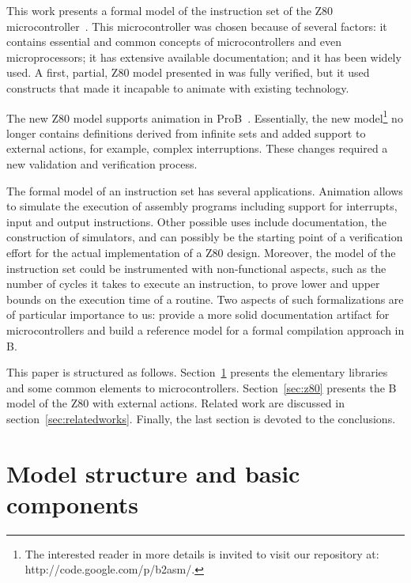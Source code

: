 \documentclass[a4paper]{llncs}
\begin{document}
This work presents a formal model of the instruction set of the Z80
microcontroller~\cite{Z80_manual}. This microcontroller was chosen
because of several factors: it contains essential and common concepts
of microcontrollers and even microprocessors; it has extensive
available documentation; and it has been widely used.  A first,
partial, Z80 model presented in \cite{Valerio_SBMF09} was fully
verified, but it used constructs that made it incapable to animate 
with existing technology. 

The new Z80 model supports animation in ProB~\cite{proB}.  Essentially, the
new model\footnote{The interested reader in more details is invited to visit
our repository at: http://code.google.com/p/b2asm/.} no longer contains
definitions derived from infinite sets and added support to external actions, 
for example, complex interruptions. These changes required a new validation
and verification process.

The formal model of an instruction set has several
applications. Animation allows to simulate the execution of assembly
programs including support for interrupts, input and output
instructions. Other possible uses include documentation, the
construction of simulators, and can possibly be the starting point of
a verification effort for the actual implementation of a Z80
design. Moreover, the model of the instruction set could be
instrumented with non-functional aspects, such as the number of cycles
it takes to execute an instruction, to prove lower and upper bounds on
the execution time of a routine.  Two aspects of such formalizations
are of particular importance to us: provide a more solid documentation
artifact for microcontrollers and build a reference model for a formal
compilation approach in B.


This paper is structured as follows.  Section~\ref{sec:models}
presents the elementary libraries and some common elements
to microcontrollers.  Section~\ref{sec:z80} presents the B
model of the Z80 with external actions.  Related work are discussed in
section~\ref{sec:relatedworks}. Finally, the last section is devoted
to the conclusions.



\section{Model structure and basic components}
\label{sec:models}
\end{document}
